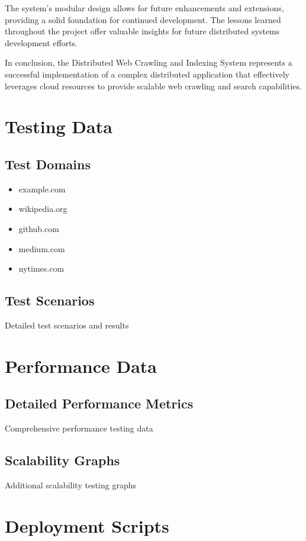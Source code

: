 \documentclass[12pt,a4paper]{report}
\begin{document}
The system's modular design allows for future enhancements and extensions, providing a solid foundation for continued development. The lessons learned throughout the project offer valuable insights for future distributed systems development efforts.

In conclusion, the Distributed Web Crawling and Indexing System represents a successful implementation of a complex distributed application that effectively leverages cloud resources to provide scalable web crawling and search capabilities.

\appendix

\chapter{Testing Data}

\section{Test Domains}
\begin{itemize}
    \item example.com
    \item wikipedia.org
    \item github.com
    \item medium.com
    \item nytimes.com
\end{itemize}

\section{Test Scenarios}
Detailed test scenarios and results

\chapter{Performance Data}

\section{Detailed Performance Metrics}
Comprehensive performance testing data

\section{Scalability Graphs}
Additional scalability testing graphs

\chapter{Deployment Scripts}
\end{document}
